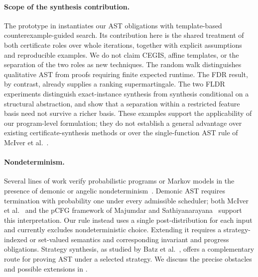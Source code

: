 \paragraph{Scope of the synthesis contribution.}
The prototype in  instantiates our AST
obligations with template-based counterexample-guided search. Its contribution
here is the shared treatment of both certificate roles over whole iterations,
together with explicit assumptions and reproducible examples. We do not claim
CEGIS, affine templates, or the separation of the two roles as new techniques.
The random walk distinguishes qualitative AST from proofs requiring finite
expected runtime. The FDR result, by contrast, already supplies a ranking
supermartingale. The two FLDR experiments distinguish exact-instance synthesis
from synthesis conditional on a structural abstraction, and show that a
separation within a restricted feature basis need not survive a richer basis.
These examples support the applicability of our program-level formulation;
they do not establish a general advantage over existing certificate-synthesis
methods or over the single-function AST rule of McIver et al.~\cite{10.1145/3158121}.

\paragraph{Nondeterminism.}
Several lines of work verify probabilistic programs or Markov models in the presence of demonic or angelic nondeterminism~\cite{10.1145/3158121,DBLP:journals/pacmpl/BatzBKW24,Wang2018ADS,Zilberstein2025,10.1145/3743131,Zilberstein_2025}. Demonic AST requires termination with probability one under every admissible scheduler; both McIver et al.~\cite{10.1145/3158121} and the pCFG framework of Majumdar and Sathiyanarayana~\cite{DBLP:journals/pacmpl/MajumdarS25} support this interpretation. Our rule instead uses a single post-distribution for each input and currently excludes nondeterministic choice. Extending it requires a strategy-indexed or set-valued semantics and corresponding invariant and progress obligations. Strategy synthesis, as studied by Batz et al.~\cite{DBLP:journals/pacmpl/BatzBKW24}, offers a complementary route for proving AST under a selected strategy. We discuss the precise obstacles and possible extensions in .
